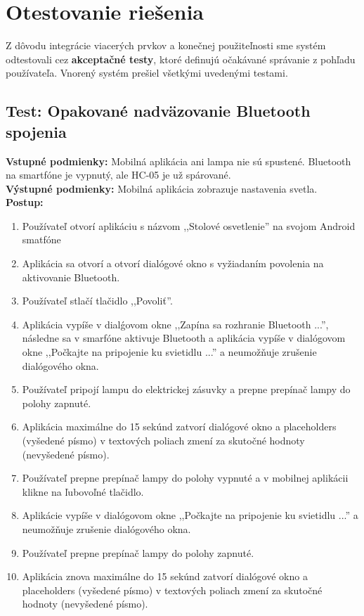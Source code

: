\documentclass[12pt, a4paper]{article}
\begin{document}
\section{Otestovanie riešenia}
Z dôvodu integrácie viacerých prvkov a konečnej použiteľnosti sme systém odtestovali cez \textbf{akceptačné testy}, ktoré definujú očakávané správanie z pohľadu používateľa. Vnorený systém prešiel všetkými uvedenými testami.
\vspace{1em}

\subsection{Test: Opakované nadväzovanie Bluetooth spojenia}
\noindent\textbf{Vstupné podmienky:} Mobilná aplikácia ani lampa nie sú spustené. Bluetooth na smartfóne je vypnutý, ale HC-05 je už spárované. \\
\textbf{Výstupné podmienky:} Mobilná aplikácia zobrazuje nastavenia svetla. \\
\textbf{Postup:}
\begin{enumerate}
\itemsep0pt
\item Používateľ otvorí aplikáciu s názvom ,,Stolové osvetlenie'' na svojom Android smatfóne 
\item Aplikácia sa otvorí a otvorí dialógové okno s vyžiadaním povolenia na aktivovanie Bluetooth.
\item Používateľ stlačí tlačidlo ,,Povoliť''.
\item Aplikácia vypíše v dialǵovom okne ,,Zapína sa rozhranie Bluetooth ...'', následne sa v smarfóne aktivuje Bluetooth
a aplikácia vypíše v dialógovom okne ,,Počkajte na pripojenie ku svietidlu ...'' a neumožňuje zrušenie dialógového okna.
\item Používateľ pripojí lampu do elektrickej zásuvky a prepne prepínač lampy do polohy zapnuté.
\item Aplikácia maximálne do 15 sekúnd zatvorí dialógové okno a placeholders (vyšedené písmo) v textových poliach zmení za skutočné hodnoty (nevyšedené písmo).
\item Používateľ prepne prepínač lampy do polohy vypnuté a v mobilnej aplikácii klikne na ľubovoľné tlačidlo.
\item Aplikácie vypíše v dialógovom okne ,,Počkajte na pripojenie ku svietidlu ...'' a neumožňuje zrušenie dialógového okna.
\item Používateľ prepne prepínač lampy do polohy zapnuté.
\item Aplikácia znova maximálne do 15 sekúnd zatvorí dialógové okno a placeholders (vyšedené písmo) v textových poliach zmení za skutočné hodnoty (nevyšedené písmo).
\end{enumerate}
\end{document}
